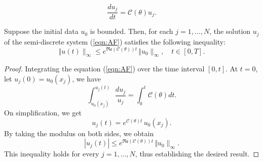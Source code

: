 \documentclass[10pt,a4paper]{amsart}
\begin{document}
\begin{equation}\label{eqn:AF}
    \dfrac{d u_j}{dt} = \mathcal{C}(\theta) u_j.
\end{equation}

\begin{theorem}\label{Thm:Decay_estimate}
Suppose the initial data $u_0$ is bounded. Then, for each $j = 1, \dots, N$, the solution $u_j$ of the semi-discrete system (\ref{eqn:AF}) satisfies the following inequality:
\begin{equation}\label{Decay_estimate}
    \Vert u(t) \rVert_{\infty} \leq e^{\mathfrak{Re}(\mathcal{C} (\theta))t} \, \Vert u_0 \rVert_{\infty}, \quad t \in [0, T].
\end{equation}
\end{theorem}

\begin{proof}
Integrating the equation (\ref{eqn:AF}) over the time interval $[0, t]$. At $t=0$, let $u_j(0) = u_0(x_j)$, we have
\begin{equation*}
    \int_{u_0(x_j)}^{u_j(t)} \dfrac{d u_j}{u_j} =\int_{0}^{t} \mathcal{C}(\theta) dt.
\end{equation*}
On simplification, we get
\begin{equation*}
    u_j(t) = e^{\mathcal{C}(\theta)t} \, u_0(x_j).
\end{equation*}
By taking the modulus on both sides, we obtain
\begin{equation*}
    |u_j(t)| \leq e^{\mathfrak{Re}(\mathcal{C}(\theta))t} \, \Vert u_0 \rVert_{\infty}.
\end{equation*}
This inequality holds for every $j = 1, \dots, N$, thus establishing the desired result. 
\end{proof}
\end{document}

